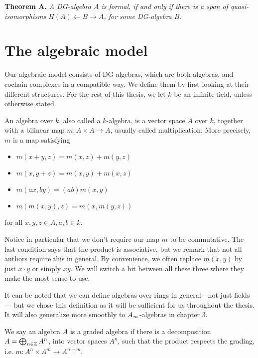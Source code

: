 \textbf{Theorem A. } \textit{A DG-algebra $A$ is formal, if and only if there is	a span of quasi-isomorphisms $H(A)\leftarrow B	\rightarrow A$, for some DG-algebra $B$.}


\section{The algebraic model}

Our algebraic model consists of DG-algebras, which are both algebras, and cochain complexes in a compatible way. We define them by first looking at their different structures. For the rest of this thesis, we let $k$ be an infinite field, unless otherwise stated.  

\begin{definition}[Algebra]
An algebra over $k$, also called a $k$-algebra, is a vector space $A$ over $k$, together with a bilinear map $m: A\times A\rightarrow A$, usually called multiplication. More precisely, $m$ is a map satisfying 
\begin{itemize}
    \item $m(x+y, z) = m(x, z) + m(y, z)$
    \item $m(x, y+z) = m(x, y) + m(x, z)$
    \item $m(ax, by) = (ab)m(x, y)$
    \item $m(m(x, y), z) = m(x, m(y, z))$
\end{itemize}
for all $x, y , z \in A, a, b\in k$. 
\end{definition}

Notice in particular that we don't require our map $m$ to be commutative. The last condition says that the product is associative, but we remark that not all authors require this in general. By convenience, we often replace $m(x, y)$ by just $x\cdot y$ or simply $xy$. We will switch a bit between all these three where they make the most sense to use. 

It can be noted that we can define algebras over rings in general---not just fields--- but we chose this definition as it will be sufficient for us throughout the thesis. It will also generalize more smoothly to $A_{\infty}$-algebras in chapter 3. 

\begin{definition}
We say an algebra $A$ is a graded algebra if there is a decomposition $A = \bigoplus_{n\in \mathbb{Z}}A^n$, into vector spaces $A^n$, such that the product respects the grading, i.e. $m:A^n\times A^m \rightarrow A^{n+m}$. 
\end{definition}

